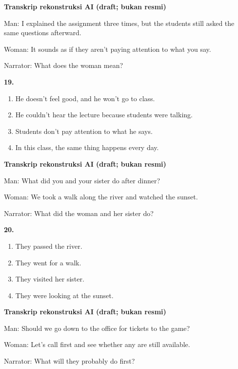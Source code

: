 \documentclass[12pt]{article}
\begin{document}
\par
\vspace{0.25\baselineskip}
\begin{exampleblock}
\textbf{Transkrip rekonstruksi AI (draft; bukan resmi)}\par
Man: I explained the assignment three times, but the students still asked the same questions afterward.\par
Woman: It sounds as if they aren't paying attention to what you say.\par
Narrator: What does the woman mean?\par
\end{exampleblock}
\noindent\textbf{19.}
\begin{enumerate}[label=(\Alph*),leftmargin=*,itemsep=0.2em]
\item He doesn't feel good, and he won't go to class.
\item He couldn't hear the lecture because students were talking.
\item Students don't pay attention to what he says.
\item In this class, the same thing happens every day.
\end{enumerate}
\par
\vspace{0.25\baselineskip}
\begin{exampleblock}
\textbf{Transkrip rekonstruksi AI (draft; bukan resmi)}\par
Man: What did you and your sister do after dinner?\par
Woman: We took a walk along the river and watched the sunset.\par
Narrator: What did the woman and her sister do?\par
\end{exampleblock}
\noindent\textbf{20.}
\begin{enumerate}[label=(\Alph*),leftmargin=*,itemsep=0.2em]
\item They passed the river.
\item They went for a walk.
\item They visited her sister.
\item They were looking at the sunset.
\end{enumerate}
\par
\vspace{0.25\baselineskip}
\begin{exampleblock}
\textbf{Transkrip rekonstruksi AI (draft; bukan resmi)}\par
Man: Should we go down to the office for tickets to the game?\par
Woman: Let's call first and see whether any are still available.\par
Narrator: What will they probably do first?\par
\end{exampleblock}
\end{document}
